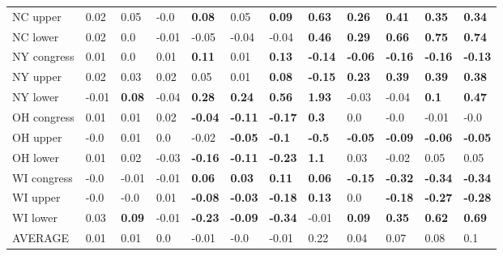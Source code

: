 \begin{tabular}{llllllllllll}
NC upper    &    0.02 &           0.05 &    -0.0 &   \textbf{0.08} &            0.05 &   \textbf{0.09} &   \textbf{0.63} &   \textbf{0.26} &   \textbf{0.41} &   \textbf{0.35} &   \textbf{0.34} \\
NC lower    &    0.02 &            0.0 &   -0.01 &           -0.05 &           -0.04 &           -0.04 &   \textbf{0.46} &   \textbf{0.29} &   \textbf{0.66} &   \textbf{0.75} &   \textbf{0.74} \\
NY congress &    0.01 &            0.0 &    0.01 &   \textbf{0.11} &            0.01 &   \textbf{0.13} &  \textbf{-0.14} &  \textbf{-0.06} &  \textbf{-0.16} &  \textbf{-0.16} &  \textbf{-0.13} \\
NY upper    &    0.02 &           0.03 &    0.02 &            0.05 &            0.01 &   \textbf{0.08} &  \textbf{-0.15} &   \textbf{0.23} &   \textbf{0.39} &   \textbf{0.39} &   \textbf{0.38} \\
NY lower    &   -0.01 &  \textbf{0.08} &   -0.04 &   \textbf{0.28} &   \textbf{0.24} &   \textbf{0.56} &   \textbf{1.93} &           -0.03 &           -0.04 &    \textbf{0.1} &   \textbf{0.47} \\
OH congress &    0.01 &           0.01 &    0.02 &  \textbf{-0.04} &  \textbf{-0.11} &  \textbf{-0.17} &    \textbf{0.3} &             0.0 &            -0.0 &           -0.01 &            -0.0 \\
OH upper    &    -0.0 &           0.01 &     0.0 &           -0.02 &  \textbf{-0.05} &   \textbf{-0.1} &   \textbf{-0.5} &  \textbf{-0.05} &  \textbf{-0.09} &  \textbf{-0.06} &  \textbf{-0.05} \\
OH lower    &    0.01 &           0.02 &   -0.03 &  \textbf{-0.16} &  \textbf{-0.11} &  \textbf{-0.23} &    \textbf{1.1} &            0.03 &           -0.02 &            0.05 &            0.05 \\
WI congress &    -0.0 &          -0.01 &   -0.01 &   \textbf{0.06} &   \textbf{0.03} &   \textbf{0.11} &   \textbf{0.06} &  \textbf{-0.15} &  \textbf{-0.32} &  \textbf{-0.34} &  \textbf{-0.34} \\
WI upper    &    -0.0 &           -0.0 &    0.01 &  \textbf{-0.08} &  \textbf{-0.03} &  \textbf{-0.18} &   \textbf{0.13} &             0.0 &  \textbf{-0.18} &  \textbf{-0.27} &  \textbf{-0.28} \\
WI lower    &    0.03 &  \textbf{0.09} &   -0.01 &  \textbf{-0.23} &  \textbf{-0.09} &  \textbf{-0.34} &           -0.01 &   \textbf{0.09} &   \textbf{0.35} &   \textbf{0.62} &   \textbf{0.69} \\
AVERAGE     &    0.01 &           0.01 &     0.0 &           -0.01 &            -0.0 &           -0.01 &            0.22 &            0.04 &            0.07 &            0.08 &             0.1 \\
\bottomrule
\end{tabular}

